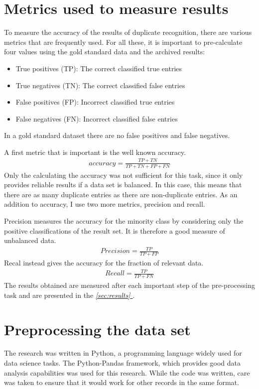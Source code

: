 \documentclass[conference]{IEEEtran}
\newcommand*{\fullref}[1]{\textit{\hyperref[{#1}]{\autoref*{#1} \nameref*{#1}}}}
\begin{document}
\section{Metrics used to measure results} \label{sec:metrics}
To measure the accuracy of the results of duplicate recognition, there are various metrics that are frequently used. For all these, it is important to pre-calculate four values using the gold standard data and the archived results:  
\begin{itemize}
	\item True positives (TP): The correct classified true entries
	\item True negatives (TN): The correct classified false entries
	\item False positives (FP): Incorrect classified true entries
	\item False negatives (FN): Incorrect classified false entries
\end{itemize}
In a gold standard dataset there are no false positives and false negatives\cite{bib:reach_for_gold}.

A first metric that is important is the well known accuracy. 
\begin{align}
 accuracy =  \frac{TP + TN}{TP + TN + FP + FN}
\end{align}
Only the calculating the accuracy was not sufficient for this task, since it only provides reliable results if a data set is balanced. In this case, this means that there are as many duplicate entries as there are non-duplicate entries. As an addition to accuracy, I use two more metrics, precision and recall.

Precision measures the accuracy for the minority class by considering only the positive classifications of the result set. It is therefore a good measure of unbalanced data.
\begin{align}
	Precision = \frac{TP}{TP + FP}
\end{align}
Recal instead gives the accuracy for the fraction of relevant data.
\begin{align}
	Recall = \frac{TP}{TP + FN}
\end{align}
The results obtained are measured after each important step of the pre-processing task and are presented in the \fullref{sec:results}.
\section{Preprocessing the data set} \label{sec_methods}
The research was written in Python, a programming language widely used for data science tasks. The Python-Pandas framework, which provides good data analysis capabilities was used for this research\cite{bib:pandas_doc}. While the code was written, care was taken to ensure that it would work for other records in the same format. 
\end{document}
